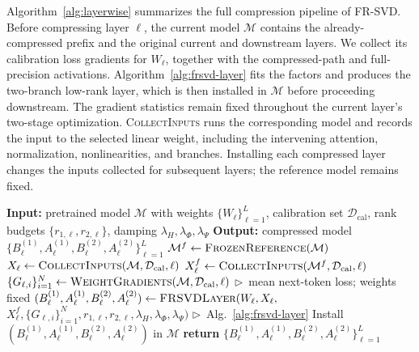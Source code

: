 Algorithm~\ref{alg:layerwise} summarizes the full compression pipeline of FR-SVD. Before compressing layer $\ell$, the current model $\mathcal M$ contains the already-compressed prefix and the original current and downstream layers. We collect its calibration loss gradients for $W_\ell$, together with the compressed-path and full-precision activations. Algorithm~\ref{alg:frsvd-layer} fits the factors and produces the two-branch low-rank layer, which is then installed in $\mathcal M$ before proceeding downstream. The gradient statistics remain fixed throughout the current layer's two-stage optimization. \textsc{CollectInputs} runs the corresponding model and records the input to the selected linear weight, including the intervening attention, normalization, nonlinearities, and branches. Installing each compressed layer changes the inputs collected for subsequent layers; the reference model remains fixed.

\begin{algorithm*}[t]
\caption{FR-SVD: full compression pipeline}
\label{alg:layerwise}
\small
\begin{algorithmic}[1]
\State \textbf{Input:}\; pretrained model $\mathcal M$ with weights $\{W_\ell\}_{\ell=1}^{L}$,
\Statex \hspace{3.2em} calibration set $\mathcal D_{\mathrm{cal}}$,
\Statex \hspace{3.2em} rank budgets $\{r_{1,\ell}, r_{2,\ell}\}$, damping $\lambda_H, \lambda_\Phi, \lambda_\Psi$
\State \textbf{Output:}\; compressed model $\{B_\ell^{(1)}, A_\ell^{(1)}, B_\ell^{(2)}, A_\ell^{(2)}\}_{\ell=1}^{L}$
\State $\mathcal M^f\gets\textsc{FrozenReference}(\mathcal M)$
    \State $X_\ell\gets\Call{CollectInputs}{\mathcal M,\mathcal D_{\mathrm{cal}},\ell}$
    \State $X_\ell^f\gets\Call{CollectInputs}{\mathcal M^f,\mathcal D_{\mathrm{cal}},\ell}$
    \State $\{G_{\ell,i}\}_{i=1}^N \gets \Call{WeightGradients}{\mathcal M,\mathcal D_{\mathrm{cal}},\ell}$
    \Statex \hfill $\triangleright$~mean next-token loss; weights fixed
    \State $(B_\ell^{(1)}, A_\ell^{(1)}, B_\ell^{(2)}, A_\ell^{(2)}) \gets \textsc{FRSVDLayer}(W_\ell, X_\ell,$
    \Statex \hspace{3.2em}$X_\ell^f,\{G_{\ell,i}\}_{i=1}^N,r_{1,\ell},r_{2,\ell},\lambda_H,\lambda_\Phi,\lambda_\Psi)$
    \Statex \hfill $\triangleright$~Alg.~\ref{alg:frsvd-layer}
    \State Install $(B_\ell^{(1)},A_\ell^{(1)},B_\ell^{(2)},A_\ell^{(2)})$ in $\mathcal M$
\EndFor
\State \textbf{return} $\{B_\ell^{(1)}, A_\ell^{(1)}, B_\ell^{(2)}, A_\ell^{(2)}\}_{\ell=1}^{L}$
\end{algorithmic}
\end{algorithm*}

